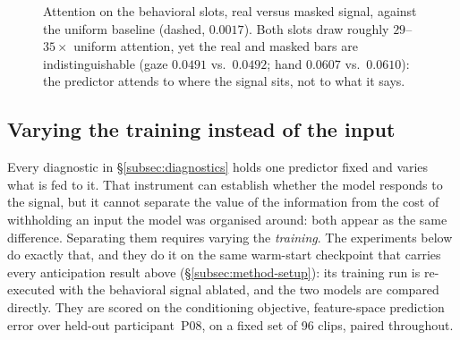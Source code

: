 \begin{figure}[t]
  \centering
  \caption{Attention on the behavioral slots, real versus masked signal, against
  the uniform baseline (dashed, $0.0017$). Both slots draw roughly $29$--$35\times$
  uniform attention, yet the real and masked bars are indistinguishable
  (gaze $0.0491$ vs.\ $0.0492$; hand $0.0607$ vs.\ $0.0610$): the predictor
  attends to where the signal sits, not to what it says.}
  \label{fig:attention}
\end{figure}

\subsection{Varying the training instead of the input}
\label{subsec:training-ablation}

Every diagnostic in \S\ref{subsec:diagnostics} holds one predictor fixed and
varies what is fed to it. That instrument can establish whether the model
responds to the signal, but it cannot separate the value of the information from
the cost of withholding an input the model was organised around: both appear as
the same difference. Separating them requires varying the \emph{training}. The
experiments below do exactly that, and they do it on the same warm-start
checkpoint that carries every anticipation result above
(\S\ref{subsec:method-setup}): its training run is re-executed with the
behavioral signal ablated, and the two models are compared directly. They are
scored on the conditioning objective, feature-space prediction error over
held-out participant~P08, on a fixed set of \num{96} clips, paired throughout.

